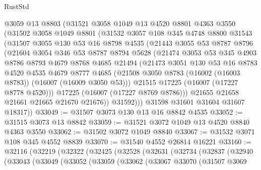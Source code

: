 \begin{lexlean}{RustStd}
\begin{coremodule}
      @3059
      @13
      @8803
      (@31521
        @3058
        @1049
        @13
        @4520
        @8801
        @4363
        @3550
        (@31502
          @3058
          @1049
          @8801
          (@31532
            @3057
            @108
            @345
            @4748
            @8800
            @31543
            (@31507
              @3055
              @130
              @53
              @16
              @8798
              @4535
              (@21443
                @3055
                @53
                @8787
                @8796
                (@21604
                  @3054
                  @346
                  @53
                  @8787
                  @8794
                  @5628
                  (@21474
                    @3053
                    @53
                    @345
                    @4903
                    @8786
                    @8793
                    @4679
                    @8768
                    @4685
                    @21494
                    (@21473
                      @3051
                      @130
                      @53
                      @16
                      @8783
                      @4520
                      @4535
                      @4679
                      @8777
                      @4685
                      (@21508 @3050 @8783 (@16002 (@16003 @8783)) (@16007 (@16009 @3050 @53)))
                      @21515
                      @17225
                      (@16007 (@17227 @8778 @4520)))
                    @17225
                    (@16007 (@17227 @8769 @8786)))
                  @21655
                  @21658
                  @21661
                  @21665
                  @21670
                  @21676))
              @31592)))
        @31598
        @31601
        @31604
        @31607
        @18317))
@33049 := @31507 @3073 @130 @13 @16 @8842 @4535
@33052 := @31515 @3073 @13 @8842
@33059 := @31521 @3072 @1049 @13 @4520 @8840 @4363 @3550
@33062 := @31502 @3072 @1049 @8840
@33067 := @31532 @3071 @108 @345 @4552 @8839
@33070 := @31540 @4552 @26814 @16221
@33160 := @32116
    (@32219
      (@32322
        (@32425
          (@32528
            (@32631
              (@32734
                (@32837
                  (@32940
                    (@33043
                      (@33049
                        (@33052
                          (@33059
                            (@33062
                              (@33067
                                @33070
                                (@31507
                                  @3069

\end{coremodule}
\end{lexlean}
